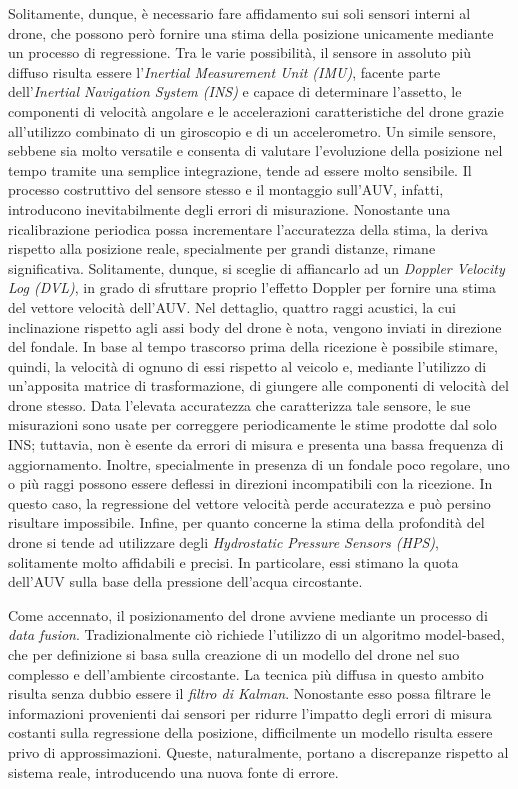 Solitamente, dunque, è necessario fare affidamento sui soli sensori interni al drone, che possono però fornire una stima della posizione unicamente mediante un processo di regressione. Tra le varie possibilità, il sensore in assoluto più diffuso risulta essere l'\emph{Inertial Measurement Unit (IMU)}, facente parte dell'\emph{Inertial Navigation System (INS)} e capace di determinare l'assetto, le componenti di velocità angolare e le accelerazioni caratteristiche del drone grazie all'utilizzo combinato di un giroscopio e di un accelerometro. Un simile sensore, sebbene sia molto versatile e consenta di valutare l'evoluzione della posizione nel tempo tramite una semplice integrazione, tende ad essere molto sensibile. Il processo costruttivo del sensore stesso e il montaggio sull'AUV, infatti, introducono inevitabilmente degli errori di misurazione. Nonostante una ricalibrazione periodica possa incrementare l'accuratezza della stima, la deriva rispetto alla posizione reale, specialmente per grandi distanze, rimane significativa. Solitamente, dunque, si sceglie di affiancarlo ad un \emph{Doppler Velocity Log (DVL)}, in grado di sfruttare proprio l'effetto Doppler per fornire una stima del vettore velocità dell'AUV. Nel dettaglio, quattro raggi acustici, la cui inclinazione rispetto agli assi body del drone è nota, vengono inviati in direzione del fondale. In base al tempo trascorso prima della ricezione è possibile stimare, quindi, la velocità di ognuno di essi rispetto al veicolo e, mediante l'utilizzo di un'apposita matrice di trasformazione, di giungere alle componenti di velocità del drone stesso. Data l'elevata accuratezza che caratterizza tale sensore, le sue misurazioni sono usate per correggere periodicamente le stime prodotte dal solo INS; tuttavia, non è esente da errori di misura e presenta una bassa frequenza di aggiornamento. Inoltre, specialmente in presenza di un fondale poco regolare, uno o più raggi possono essere deflessi in direzioni incompatibili con la ricezione. In questo caso, la regressione del vettore velocità perde accuratezza e può persino risultare impossibile. Infine, per quanto concerne la stima della profondità del drone si tende ad utilizzare degli \emph{Hydrostatic Pressure Sensors (HPS)}, solitamente molto affidabili e precisi. In particolare, essi stimano la quota dell'AUV sulla base della pressione dell'acqua circostante.

Come accennato, il posizionamento del drone avviene mediante un processo di \emph{data fusion}. Tradizionalmente ciò richiede l'utilizzo di un algoritmo model-based, che per definizione si basa sulla creazione di un modello del drone nel suo complesso e dell'ambiente circostante. La tecnica più diffusa in questo ambito risulta senza dubbio essere il \emph{filtro di Kalman}. Nonostante esso possa filtrare le informazioni provenienti dai sensori per ridurre l'impatto degli errori di misura costanti sulla regressione della posizione, difficilmente un modello risulta essere privo di approssimazioni. Queste, naturalmente, portano a discrepanze rispetto al sistema reale, introducendo una nuova fonte di errore. 

